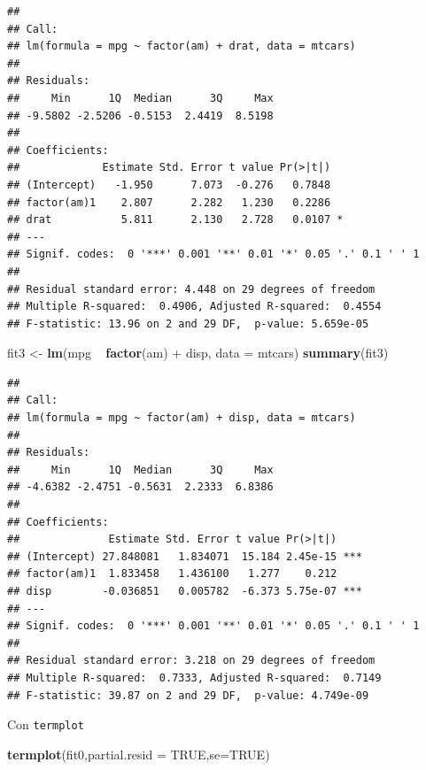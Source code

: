 \documentclass[]{article}
\newenvironment{Shaded}{\begin{snugshade}}{\end{snugshade}}
\newcommand{\KeywordTok}[1]{\textcolor[rgb]{0.13,0.29,0.53}{\textbf{{#1}}}}
\newcommand{\DataTypeTok}[1]{\textcolor[rgb]{0.13,0.29,0.53}{{#1}}}
\newcommand{\StringTok}[1]{\textcolor[rgb]{0.31,0.60,0.02}{{#1}}}
\newcommand{\OtherTok}[1]{\textcolor[rgb]{0.56,0.35,0.01}{{#1}}}
\newcommand{\NormalTok}[1]{{#1}}
\numberwithin{equation}{section}
\begin{document}
\begin{verbatim}
## 
## Call:
## lm(formula = mpg ~ factor(am) + drat, data = mtcars)
## 
## Residuals:
##     Min      1Q  Median      3Q     Max 
## -9.5802 -2.5206 -0.5153  2.4419  8.5198 
## 
## Coefficients:
##             Estimate Std. Error t value Pr(>|t|)  
## (Intercept)   -1.950      7.073  -0.276   0.7848  
## factor(am)1    2.807      2.282   1.230   0.2286  
## drat           5.811      2.130   2.728   0.0107 *
## ---
## Signif. codes:  0 '***' 0.001 '**' 0.01 '*' 0.05 '.' 0.1 ' ' 1
## 
## Residual standard error: 4.448 on 29 degrees of freedom
## Multiple R-squared:  0.4906, Adjusted R-squared:  0.4554 
## F-statistic: 13.96 on 2 and 29 DF,  p-value: 5.659e-05
\end{verbatim}

\begin{Shaded}
\begin{Highlighting}[]
\NormalTok{fit3 <-}\StringTok{ }\KeywordTok{lm}\NormalTok{(mpg ~}\StringTok{ }\KeywordTok{factor}\NormalTok{(am) +}\StringTok{ }\NormalTok{disp, }\DataTypeTok{data =} \NormalTok{mtcars)}
\KeywordTok{summary}\NormalTok{(fit3)}
\end{Highlighting}
\end{Shaded}

\begin{verbatim}
## 
## Call:
## lm(formula = mpg ~ factor(am) + disp, data = mtcars)
## 
## Residuals:
##     Min      1Q  Median      3Q     Max 
## -4.6382 -2.4751 -0.5631  2.2333  6.8386 
## 
## Coefficients:
##              Estimate Std. Error t value Pr(>|t|)    
## (Intercept) 27.848081   1.834071  15.184 2.45e-15 ***
## factor(am)1  1.833458   1.436100   1.277    0.212    
## disp        -0.036851   0.005782  -6.373 5.75e-07 ***
## ---
## Signif. codes:  0 '***' 0.001 '**' 0.01 '*' 0.05 '.' 0.1 ' ' 1
## 
## Residual standard error: 3.218 on 29 degrees of freedom
## Multiple R-squared:  0.7333, Adjusted R-squared:  0.7149 
## F-statistic: 39.87 on 2 and 29 DF,  p-value: 4.749e-09
\end{verbatim}

Con \texttt{termplot}

\begin{Shaded}
\begin{Highlighting}[]
\KeywordTok{termplot}\NormalTok{(fit0,}\DataTypeTok{partial.resid =} \OtherTok{TRUE}\NormalTok{,}\DataTypeTok{se=}\OtherTok{TRUE}\NormalTok{)}
\end{Highlighting}
\end{Shaded}
\end{document}
